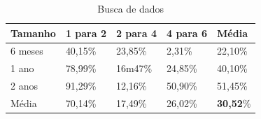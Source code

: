 \begin{table}[]
	\centering
	\caption{Busca de dados}
	\label{tab:melhora_select}
	\begin{tabular}{lllll}
		\textbf{Tamanho} & \textbf{1 para 2} & \textbf{2 para 4} & \textbf{4 para 6} & \textbf{Média} \\ \hline
		6 meses          & 40,15\%		 	 & 23,85\%        	 & 2,31\%         	 & 22,10\%        \\ \hline
		1 ano            & 78,99\% 		 	 & 16m47\%       	 & 24,85\%        	 & 40,10\%         \\ \hline
		2 anos           & 91,29\%		 	 & 12,16\%        	 & 50,90\%        	 & 51,45\%         \\ \hline
        Média 		     & 70,14\%		 	 & 17,49\%        	 & 26,02\%        	 & \textbf{30,52}\%         \\ \hline
	\end{tabular}
\end{table}